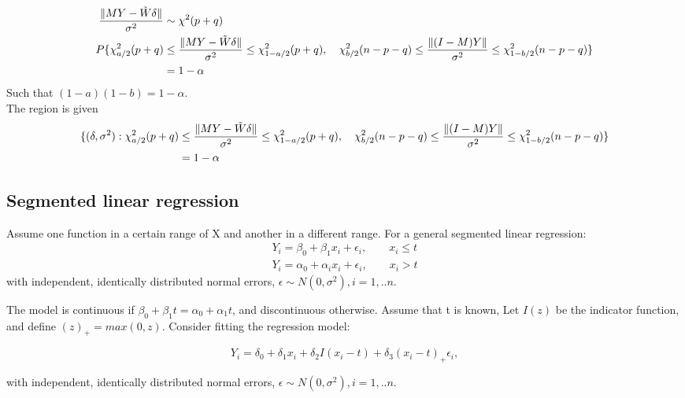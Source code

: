 \begin{itemize}
\begin{align*}
\frac{ \lVert M Y - \Tilde{W} \delta \rVert}{\sigma^2} & \sim \chi^2(p+q) \\
P\{ \chi^2_{a/2}{(p+q)} &\leq \frac{\lVert MY - \Tilde{W} \delta  \rVert}{\sigma^2} \leq \chi^2_{1-a/2}{(p+q)}, \quad
\chi^2_{b/2}{(n-p-q)} \leq \frac{\lVert (I-M) Y \rVert}{\sigma^2} \leq \chi^2_{1-b/2}{(n-p-q)} \}\\
&= 1- \alpha
\end{align*}
Such that $(1-a)(1-b) = 1-\alpha$. \\
The region is given
\begin{align*}
\{(\delta, \sigma^2): \chi^2_{a/2}{(p+q)} &\leq \frac{\lVert MY -\Tilde{W} \delta \rVert}{\sigma^2} \leq \chi^2_{1-a/2}{(p+q)}, \quad
\chi^2_{b/2}{(n-p-q)} \leq \frac{\lVert (I-M) Y \rVert}{\sigma^2} \leq \chi^2_{1-b/2}{(n-p-q)} \}\\
&= 1- \alpha
\end{align*}
\end{itemize}


 
 \subsection{Segmented linear regression} 
 
 Assume one function in a certain range of X and another in a different range. For a general segmented linear regression:
    \[ 
    \begin{split}
     Y_i = \beta_0 + \beta_1 x_i + \epsilon_i, \qquad  x_i \leq t \\
     Y_i = \alpha_0 + \alpha_i x_i + \epsilon_i, \qquad x_i > t
    \end{split}
    \] 
with independent, identically distributed normal errors, $\epsilon \sim N(0, \sigma^2), i= 1,..n$.

The model is continuous if $\beta_0 + \beta_1t = \alpha_0 + \alpha_1t$, and discontinuous otherwise. Assume that t is known, Let $I(z)$ be the indicator function, and define $(z)_{+} = max(0,z)$. Consider fitting the regression model:

    \begin{equation}
     Y_i = \delta_0 + \delta_1 x_i + \delta_2I(x_i-t) + \delta_3 (x_i-t)_{+} \epsilon_i, 
    \end{equation}

with independent, identically distributed normal errors, $\epsilon \sim N(0, \sigma^2), i= 1,..n$.

